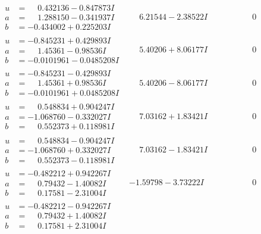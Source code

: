 \documentclass[1p]{elsarticle_modified}
\theoremstyle{definition}
\begin{document}
$$\begin{array}{c|c|c}
\begin{aligned}
u &= \phantom{-}0.432136 - 0.847873 I \\
a &= \phantom{-}1.288150 - 0.341937 I \\
b &= -0.434002 + 0.225203 I\end{aligned}
 & \phantom{-}6.21544 - 2.38522 I & \phantom{-0.000000 } 0 \\ \hline\begin{aligned}
u &= -0.845231 + 0.429893 I \\
a &= \phantom{-}1.45361 - 0.98536 I \\
b &= -0.0101961 - 0.0485208 I\end{aligned}
 & \phantom{-}5.40206 + 8.06177 I & \phantom{-0.000000 } 0 \\ \hline\begin{aligned}
u &= -0.845231 - 0.429893 I \\
a &= \phantom{-}1.45361 + 0.98536 I \\
b &= -0.0101961 + 0.0485208 I\end{aligned}
 & \phantom{-}5.40206 - 8.06177 I & \phantom{-0.000000 } 0 \\ \hline\begin{aligned}
u &= \phantom{-}0.548834 + 0.904247 I \\
a &= -1.068760 - 0.332027 I \\
b &= \phantom{-}0.552373 + 0.118981 I\end{aligned}
 & \phantom{-}7.03162 + 1.83421 I & \phantom{-0.000000 } 0 \\ \hline\begin{aligned}
u &= \phantom{-}0.548834 - 0.904247 I \\
a &= -1.068760 + 0.332027 I \\
b &= \phantom{-}0.552373 - 0.118981 I\end{aligned}
 & \phantom{-}7.03162 - 1.83421 I & \phantom{-0.000000 } 0 \\ \hline\begin{aligned}
u &= -0.482212 + 0.942267 I \\
a &= \phantom{-}0.79432 - 1.40082 I \\
b &= \phantom{-}0.17581 - 2.31004 I\end{aligned}
 & -1.59798 - 3.73222 I & \phantom{-0.000000 } 0 \\ \hline\begin{aligned}
u &= -0.482212 - 0.942267 I \\
a &= \phantom{-}0.79432 + 1.40082 I \\
b &= \phantom{-}0.17581 + 2.31004 I\end{aligned}

\end{array}$$
\end{document}
